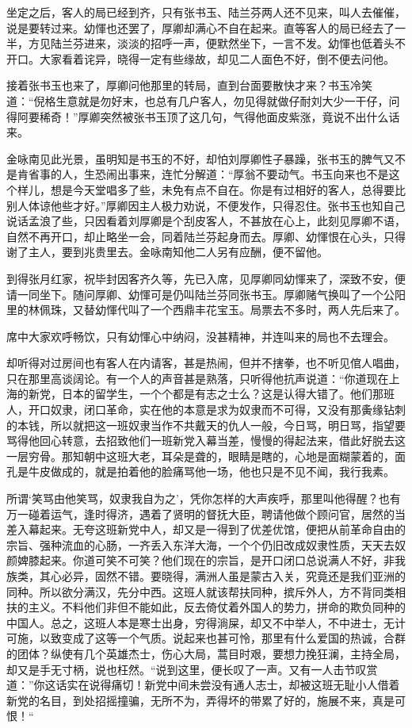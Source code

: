 \documentclass[12pt,UTF8]{ctexbook}
\begin{document}
{{{坐定之后，客人的局已经到齐，只有张书玉、陆兰芬两人还不见来，叫人去催催，说是要转过来。幼惲也还罢了，厚卿却满心不自在起来。直等客人的局已经去了一半，方见陆兰芬进来，淡淡的招呼一声，便默然坐下，一言不发。幼惲也低着头不开口。大家看着诧异，晓得一定有些缘故，却见二人面色不好，倒不便去问他。

接着张书玉也来了，厚卿问他那里的转局，直到台面要散快才来？书玉冷笑道：“倪格生意就是勿好末，也总有几户客人，勿见得就做仔耐刘大少一干仔，问得阿要稀奇！”厚卿突然被张书玉顶了这几句，气得他面皮紫涨，竟说不出什么话来。

金咏南见此光景，虽明知是书玉的不好，却怕刘厚卿性子暴躁，张书玉的脾气又不是肯省事的人，生恐闹出事来，连忙分解道：“厚翁不要动气。书玉向来也不是这个样儿，想是今天堂唱多了些，未免有点不自在。你是有过相好的客人，总得要比别人体谅他些才好。”厚卿因主人极力劝说，不便发作，只得忍住。张书玉也知自己说话孟浪了些，只因看着刘厚卿是个刮皮客人，不甚放在心上，此刻见厚卿不语，自然不再开口，却止略坐一会，同着陆兰芬起身而去。厚卿、幼惲恨在心头，只得谢了主人，要到兆贵里去。金咏南知他二人另有应酬，便不留他。

到得张月红家，祝毕封因客齐久等，先已入席，见厚卿同幼惲来了，深致不安，便请一同坐下。随问厚卿、幼惲可是仍叫陆兰芬同张书玉。厚卿赌气换叫了一个公阳里的林佩珠，又替幼惲代叫了一个西鼎丰花宝玉。局票去不多时，两人先后来了。

席中大家欢呼畅饮，只有幼惲心中纳闷，没甚精神，并连叫来的局也不去理会。

却听得对过房间也有客人在内请客，甚是热闹，但并不搳拳，也不听见倌人唱曲，只在那里高谈阔论。有一个人的声音甚是熟落，只听得他抗声说道：“你道现在上海的新党，日本的留学生，一个个都是有志之士么？这是认得大错了。他们那班人，开口奴隶，闭口革命，实在他的本意是求为奴隶而不可得，又没有那夤缘钻刺的本钱，所以就把这一班奴隶当作不共戴天的仇人一般，今日骂，明日骂，指望要骂得他回心转意，去招致他们一班新党入幕当差，慢慢的得起法来，借此好脱去这一层穷骨。那知朝中这班大老，耳朵是聋的，眼睛是瞎的，心地是面糊蒙着的，面孔是牛皮做成的，就是拍着他的脸痛骂他一场，他也只是不见不闻，我行我素。

所谓‘笑骂由他笑骂，奴隶我自为之’，凭你怎样的大声疾呼，那里叫他得醒？也有万一碰着运气，逢时得济，遇着了贤明的督抚大臣，聘请他做个顾问官，居然的当差入幕起来。无夸这班新党中人，却又是一得到了优差优馆，便把从前革命自由的宗旨、强种流血的心肠，一齐丢入东洋大海，一个个仍旧改成奴隶性质，天天去奴颜婢膝起来。你道可笑不可笑？他们现在的宗旨，是开口闭口总说满人不好，非我族类，其心必异，固然不错。要晓得，满洲人虽是蒙古入关，究竟还是我们亚洲的同种。所以欲分满汉，先分中西。这班人就该帮扶同种，摈斥外人，方不背同类相扶的主义。不料他们非但不能如此，反去倚仗着外国人的势力，拼命的欺负同种的中国人。总之，这班人本是寒士出身，穷得淌屎，却又不中举人，不中进士，无计可施，以致变成了这等一个气质。说起来也甚可怜，那里有什么爱国的热诚，合群的团体？纵使有几个英雄杰士，伤心大局，蒿目时艰，要想力挽狂澜，主持全局，却又是手无寸柄，说也枉然。“说到这里，便长叹了一声。又有一人击节叹赏道：”你这话实在说得痛切！新党中间未尝没有通人志士，却被这班无耻小人借着新党的名目，到处招摇撞骗，无所不为，弄得坏的带累了好的，施展不来，真是可恨！“

}}}
\end{document}

